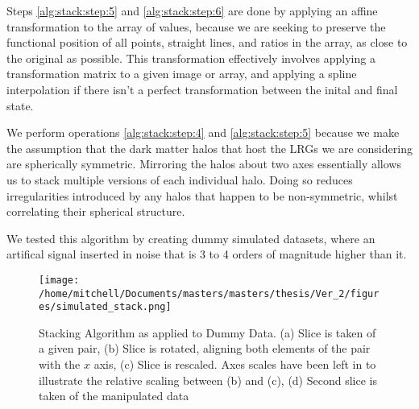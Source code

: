 
Steps \ref{alg:stack:step:5} and \ref{alg:stack:step:6} are done by applying an affine transformation to the array of values, because we are seeking to preserve the functional position of all points, straight lines, and ratios in the array, as close to the original as possible. This transformation effectively involves applying a transformation matrix to a given image or array, and applying a spline interpolation if there isn't a perfect transformation between the inital and final state.




 

We perform operations \ref{alg:stack:step:4} and \ref{alg:stack:step:5} because we make the assumption that the dark matter halos that host the LRGs we are considering are spherically symmetric. Mirroring the halos about two axes essentially allows us to stack multiple versions of each individual halo. Doing so reduces irregularities introduced by any halos that happen to be non-symmetric, whilst correlating their spherical structure. 

We tested this algorithm by creating dummy simulated datasets, where an artifical signal inserted in noise that is 3 to 4 orders of magnitude higher than it. 

\begin{figure}[h!]
\begin{center}

\texttt{[image: /home/mitchell/Documents/masters/masters/thesis/Ver\_2/figures/simulated\_stack.png]}
\caption{Stacking Algorithm as applied to Dummy Data. (a) Slice is taken of a given pair, (b) Slice is rotated, aligning both elements of the pair with the $x$ axis, (c) Slice is rescaled. Axes scales have been left in to illustrate the relative scaling between (b) and (c), (d) Second slice is taken of the manipulated data}
\end{center}
\end{figure}

